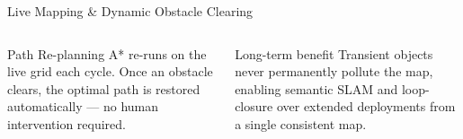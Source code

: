 \documentclass[aspectratio=169, 10pt]{beamer}
\begin{document}
\begin{frame}{Live Mapping \& Dynamic Obstacle Clearing}
\begin{columns}[T]
  \vspace{5pt}
  \begin{exampleblock}{Path Re-planning}
    \small A* re-runs on the live grid each cycle. Once an obstacle
    clears, the optimal path is restored automatically — no human
    intervention required.
  \end{exampleblock}

  \vspace{5pt}
  \begin{alertblock}{Long-term benefit}
    \small Transient objects never permanently pollute the map,
    enabling semantic SLAM and loop-closure over extended
    deployments from a single consistent map.
  \end{alertblock}

\end{columns}
\end{frame}
\end{document}
